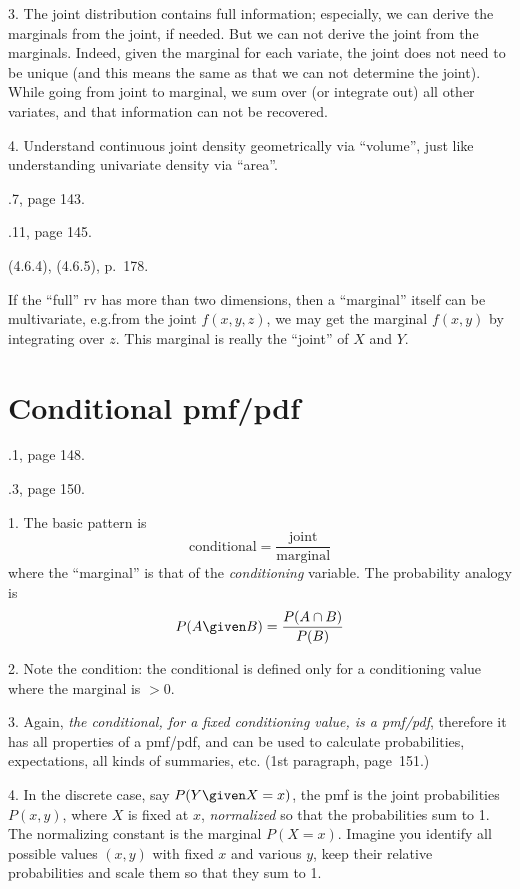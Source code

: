 \documentclass[12pt]{article}
\begin{document}
3. The joint distribution contains full information;
especially, we can derive the marginals from the joint, if needed.
But we can not derive the joint from the marginals.
Indeed, given the marginal for each variate, the joint does not need to
be unique (and this means the same as that we can not determine the
joint).
While going from joint to marginal,
we sum over (or integrate out) all other variates,
and that information can not be recovered.

4. Understand continuous joint density geometrically via ``volume'',
just like understanding univariate density via ``area''.

.7, page 143.

.11, page 145.

\alert[Generalization]%
(4.6.4), (4.6.5), p.~178.

If the ``full'' rv has more than two dimensions,
then a ``marginal'' itself can be multivariate,
e.g.\@ from the joint $f(x,y,z)$,
we may get the marginal $f(x,y)$ by integrating over $z$.
This marginal is really the ``joint'' of $X$ and $Y$.

\section{Conditional pmf/pdf}

.1, page 148.

.3, page 150.

\alert%
1. The basic pattern is
\[
\text{conditional} = \frac{\text{joint}}{\text{marginal}}
\]
where the ``marginal'' is that of the \emph{conditioning} variable.
The probability analogy is
\[
P(A \given B) = \frac{P(A \cap B)}{P(B)}
\]

2. Note the condition: the conditional is defined only for
a conditioning value where the marginal is $>0$.

3. Again, \emph{the conditional, for a fixed conditioning value,
\emph{is} a pmf/pdf}, therefore it has all properties of a pmf/pdf,
and can be used to calculate probabilities, expectations, all kinds of
summaries, etc. (1st paragraph, page~151.)

4. In the discrete case, say $P(Y \given X=x)$,
the pmf is the joint probabilities $P(x, y)$, where $X$ is fixed at $x$,
\emph{normalized} so that the probabilities sum to 1.
The normalizing constant is the marginal $P(X = x)$.
Imagine you identify all possible values
$(x, y)$ with fixed $x$ and various $y$,
keep their relative probabilities and scale them so that they sum to 1.
\end{document}
